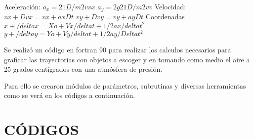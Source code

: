 \documentclass[letterpaper,10pt,twoside,onecolumn]{article}
\begin{document}
Aceleración:
$a_x = 2 1 D/m 2 vvx $
$a_y = 2g 2 1 D/m 2 vv$
Velocidad:
$vx + Dvx = vx + axDt$
$ vy + Dvy = vy + ayDt$
Coordenadas
$x+/delta x =  Xo + Vx/delta t+ 1/2ax/delta t^2$
$y+/delta y =  Yo + Vy/delta t+ 1/2ay/Delta t^2$

Se realizó un código en fortran 90 para realizar los calculos necesarios para graficar las trayectorias con objetos a escoger y en tomando como medio el aire a 25 grados centígrados con una atmósfera de presión.

Para ello se crearon módulos de parámetros, subrutinas y diversas herramientas como se verá en los códigos a continuación.
\pagebreak

\section{CÓDIGOS} 
\end{document}
